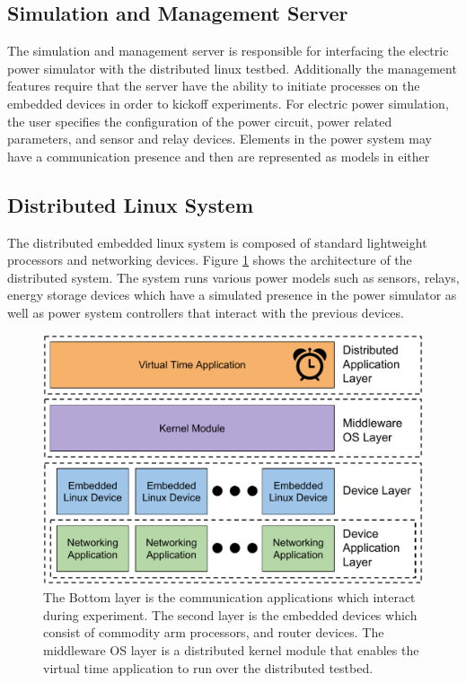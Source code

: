 \subsection{Simulation and Management Server}
The simulation and management server is responsible for interfacing the electric power simulator with the distributed linux testbed. Additionally the management features require that the server have the ability to initiate processes on the embedded devices in order to kickoff experiments. For electric power simulation, the user specifies the configuration of the power circuit, power related parameters, and sensor and relay devices. Elements in the power system may have a communication presence and then are represented as models in either

\subsection{Distributed Linux System}

The distributed embedded linux system is composed of standard lightweight processors and networking devices. Figure \ref{env} shows the architecture of the distributed system. The system runs various power models such as sensors, relays, energy storage devices which have a simulated presence in the power simulator as well as power system controllers that interact with the previous devices.

\begin{figure}
  \centering
  \label{env}
  \includegraphics[scale=0.48]{Distributed_environment.pdf}
  \caption{
    The Bottom layer is the communication applications which interact during experiment. The second layer is the embedded devices which consist of commodity arm processors, and router devices. The middleware OS layer is a distributed kernel module that enables the virtual time application to run over the distributed testbed.
    }
\end{figure}


